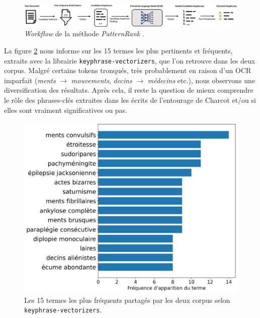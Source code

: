 \begin{figure}[!h]
    \centering
    \includegraphics[width=1\textwidth]{img/patternrank_workflow.png}
    \caption{\textit{Workflow} de la méthode \textit{PatternRank} \citep[p.~2]{schopf2022}.}
    \label{fig:patternrank}
\end{figure}

La figure \ref{fig:patternrank_partage} nous informe sur les 15 termes les plus pertinents et fréquents, extraits avec la librairie \texttt{keyphrase-vectorizers}, que l'on retrouve dans les deux corpus. Malgré certains tokens tronqués, très probablement en raison d'un \textsc{OCR} imparfait (\textit{ments} $\rightarrow$ \textit{mouvements}, \textit{decins} $\rightarrow$ \textit{médecins} etc.), nous observons une diversification des résultats. Après cela, il reste la question de mieux comprendre le rôle des phrases-clés extraites dans les écrits de l'entourage de Charcot et/ou si elles sont vraiment significatives ou pas. 

\begin{figure}[!h]
    \centering
    \includegraphics[width=1\textwidth]{img/termes_partages.png}
    \caption{Les 15 termes les plus fréquents partagés par les deux corpus selon \texttt{keyphrase-vectorizers}.}
    \label{fig:patternrank_partage}
\end{figure}
